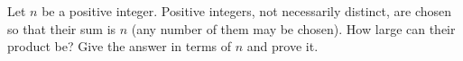 Let $n$ be a positive integer. Positive integers, not necessarily distinct, are chosen so that their sum is $n$ (any number of them may be chosen). How large can their product be? Give the answer in terms of $n$ and prove it.
